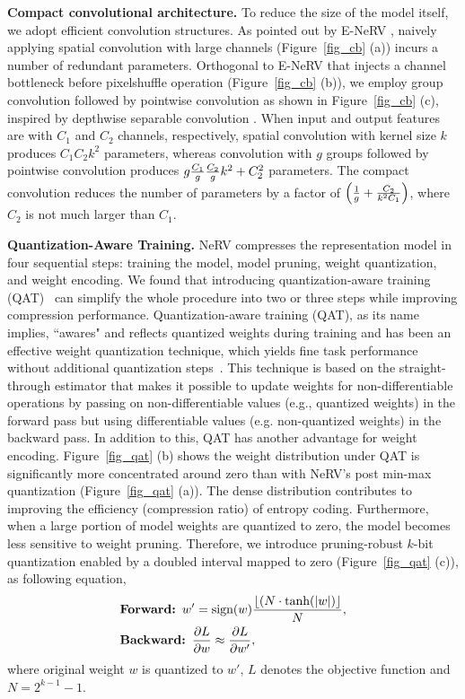 \documentclass[sigconf]{acmart}
\begin{document}
\noindent\textbf{Compact convolutional architecture.}
To reduce the size of the model itself, we adopt efficient convolution structures.
As pointed out by E-NeRV \cite{enerv}, naively applying spatial convolution with large channels (Figure~\ref{fig_cb} (a)) incurs a number of redundant parameters.
Orthogonal to E-NeRV that injects a channel bottleneck before pixelshuffle operation (Figure~\ref{fig_cb} (b)), we employ group convolution followed by pointwise convolution as shown in Figure~\ref{fig_cb} (c), inspired by depthwise separable convolution \cite{mobilenet}.
When input and output features are with $C_1$ and $C_2$ channels, respectively, spatial convolution with kernel size $k$ produces $C_1 C_2 k^2$ parameters, whereas convolution with $g$ groups followed by pointwise convolution produces $g {C_1\over g} {C_2\over g} k^2 + C_2^2$ parameters.
The compact convolution reduces the number of parameters by a factor of $\left({1\over g}+{C_2 \over k^2 C_1}\right)$, where $C_2$ is not much larger than $C_1$.

\noindent\textbf{Quantization-Aware Training.}
NeRV compresses the representation model in four sequential steps: training the model, model pruning, weight quantization, and weight encoding.
We found that introducing quantization-aware training (QAT)~\cite{dorefa,qat,anypre} can simplify the whole procedure into two or three steps
while improving compression performance.
Quantization-aware training (QAT), as its name implies, ``awares" and reflects quantized weights during training and has been an effective weight quantization technique, which yields fine task performance without additional quantization steps~\cite{dorefa, qat, anypre}.
This technique is based on the straight-through estimator that makes it possible to update weights for non-differentiable operations by passing on non-differentiable values (e.g., quantized weights) in the forward pass but using differentiable values (e.g. non-quantized weights) in the backward pass.
In addition to this, QAT has another advantage for weight encoding.
Figure~\ref{fig_qat} (b) shows the weight distribution under QAT is significantly more concentrated around zero than with NeRV's post min-max quantization (Figure~\ref{fig_qat} (a)).
The dense distribution contributes to improving the efficiency (compression ratio) of entropy coding.
Furthermore, when a large portion of model weights are quantized to zero, the model becomes less sensitive to weight pruning.
Therefore, we introduce pruning-robust $k$-bit quantization enabled by a doubled interval mapped to zero (Figure~\ref{fig_qat} (c)), as following equation,
\begin{equation}
\label{eq_qat}
\begin{split}
    &\textbf{Forward: } w' = \textrm{sign}(w){\lfloor (N\cdot \textrm{tanh}(|w|) \rfloor\over N},\\
    &\textbf{Backward: } {\partial L \over \partial w} \approx {\partial L \over \partial w'},
    \end{split}
\end{equation}
where original weight $w$ is quantized to $w'$, $L$ denotes the objective function and $N = 2^{k-1} - 1$.
\end{document}
